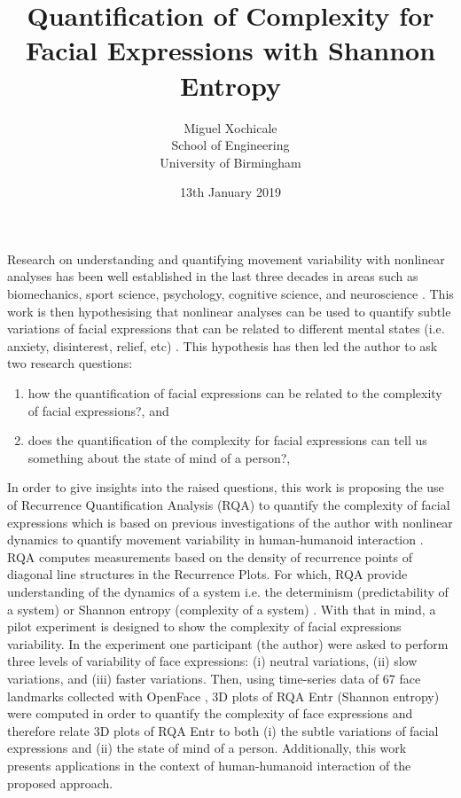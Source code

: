\documentclass[12pt]{article}
\title{
Quantification of Complexity for \\
Facial Expressions with Shannon Entropy
}
\author{Miguel Xochicale \\
School of Engineering \\
University of Birmingham}
\date{13th January 2019}
\begin{document}
\maketitle
\thispagestyle{empty} %

Research on understanding and quantifying movement variability 
with nonlinear analyses has been well established in the last three 
decades in areas such as biomechanics, sport science, psychology, 
cognitive science, and neuroscience \cite{davids2003}.
This work is then hypothesising that nonlinear analyses 
can be used to quantify subtle variations of facial expressions 
that can be related to different mental states 
(i.e. anxiety, disinterest, relief, etc) \cite{back2014}.
This hypothesis has then led the author to ask two research questions: 
\begin{enumerate}[label=(\roman*)]
\item how the quantification of facial expressions can be related to  
	the complexity of facial expressions?, and 
\item does the quantification of the complexity for facial expressions 
	can tell us something about the state of mind of a person?, 
\end{enumerate}


In order to give insights into the raised questions,
this work is proposing 
the use of Recurrence Quantification Analysis (RQA) 
to quantify the complexity of facial expressions 
which is based on previous investigations of the author 
with nonlinear dynamics to quantify movement variability 
in human-humanoid interaction \cite{XochicalePhDThesis2018}.
RQA computes measurements based on the density of 
recurrence points of diagonal line 
structures in the Recurrence Plots.
For which, RQA provide understanding of the dynamics of a system i.e. 
the determinism (predictability of a system) or 
Shannon entropy (complexity of a system) \cite{marwan2007}.
With that in mind, a pilot experiment is designed 
to show the complexity of facial expressions variability. 
In the experiment one participant (the author) 
were asked to perform 
three levels of variability of face expressions:
(i) neutral variations, (ii) slow variations, and (iii) faster variations.
Then, using time-series data of 67 face landmarks collected 
with OpenFace \cite{baltrusaitis2018}, 3D plots
of RQA Entr (Shannon entropy) were computed in order
to quantify the complexity of face expressions and 
therefore relate 3D plots of RQA Entr 
to both (i) the subtle variations of facial expressions 
and (ii) the state of mind of a person. Additionally,
this work presents applications in the context of 
human-humanoid interaction of the proposed approach.




\end{document}
